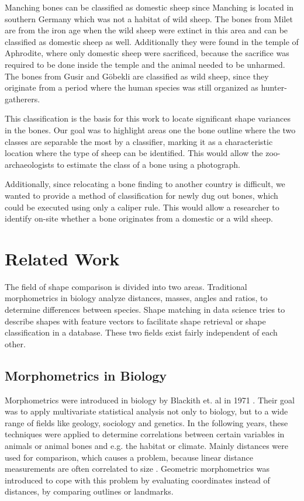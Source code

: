 \documentclass[pdftex,12pt,a4paper]{report}
\begin{document}
Manching bones can be classified as domestic sheep since Manching is located in southern Germany which was not a habitat of wild sheep. The bones from Milet are from the iron age when the wild sheep were extinct in this area and can be classified as domestic sheep as well. Additionally they were found in the temple of Aphrodite, where only domestic sheep were sacrificed, because the sacrifice was required to be done inside the temple and the animal needed to be unharmed. The bones from Gusir and Göbekli are classified as wild sheep, since they originate from a period where the human species was still organized as hunter-gatherers.

This classification is the basis for this work to locate significant shape variances in the bones. Our goal was to highlight areas one the bone outline where the two classes are separable the most by a classifier, marking it as a characteristic location where the type of sheep can be identified. This would allow the zoo-archaeologists to estimate the class of a bone using a photograph.

Additionally, since relocating a bone finding to another country is difficult, we wanted to provide a method of classification for newly dug out bones, which could be executed using only a caliper rule. This would allow a researcher to identify on-site whether a bone originates from a domestic or a wild sheep. 

\chapter{Related Work}

The field of shape comparison is divided into two areas. Traditional morphometrics in biology analyze distances, masses, angles and ratios, to determine differences between species. Shape matching in data science tries to describe shapes with feature vectors to facilitate shape retrieval or shape classification in a database. These two fields exist fairly independent of each other.

\section{Morphometrics in Biology}

Morphometrics were introduced in biology by Blackith et. al in 1971 \cite{blackith1971multivariate}. Their goal was to apply multivariate statistical analysis not only to biology, but to a wide range of fields like geology, sociology and genetics. In the following years, these techniques were applied to determine correlations between certain variables in animals or animal bones and e.g. the habitat or climate. Mainly distances were used for comparison, which causes a problem, because linear distance measurements are often correlated to size \cite{bookstein1985morphometrics}. Geometric morphometrics was introduced to cope with this problem by evaluating coordinates instead of distances, by comparing outlines or landmarks.
\end{document}
